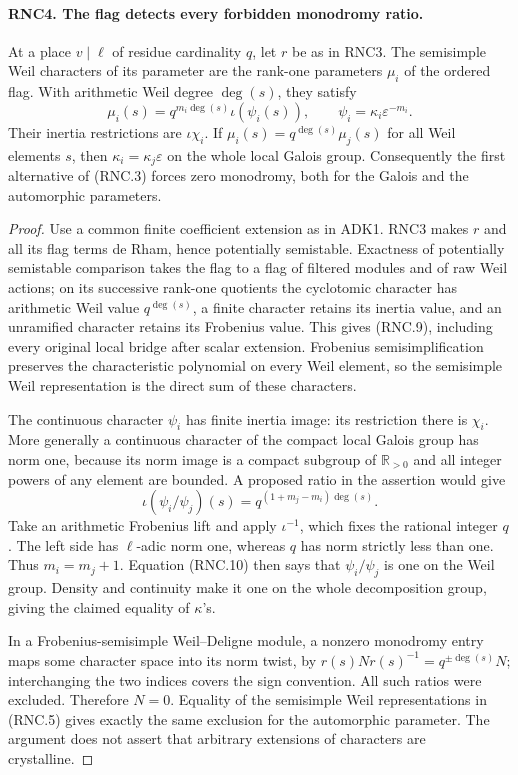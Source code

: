 \paragraph{RNC4. The flag detects every forbidden monodromy ratio.}
\label{claim:RNC4}
At a place $v\mid\ell$ of residue cardinality $q$, let $r$
be as in RNC3.  The semisimple Weil characters of its parameter
are the rank-one parameters $\mu_i$ of the ordered flag.
With arithmetic Weil degree $\deg(s)$, they satisfy
\[
 \mu_i(s)=q^{m_i\deg(s)}\iota(\psi_i(s)),\qquad
 \psi_i=\kappa_i\varepsilon^{-m_i}.                            \tag{RNC.9}
\]
Their inertia restrictions are $\iota\chi_i$.  If
$\mu_i(s)=q^{\deg(s)}\mu_j(s)$ for all Weil elements $s$,
then $\kappa_i=\kappa_j\varepsilon$ on the whole local Galois
group.  Consequently the first alternative of (RNC.3) forces
zero monodromy, both for the Galois and the automorphic
parameters.
\begin{proof}
Use a common finite coefficient extension as in ADK1.
RNC3 makes $r$ and all its flag terms de Rham, hence potentially
semistable.  Exactness of potentially semistable comparison
takes the flag to a flag of filtered modules and of raw Weil
actions; on its successive rank-one quotients the cyclotomic
character has arithmetic Weil value $q^{\deg(s)}$, a finite
character retains its inertia value, and an unramified
character retains its Frobenius value.  This gives (RNC.9),
including every original local bridge after scalar extension.
Frobenius semisimplification preserves the characteristic
polynomial on every Weil element, so the semisimple Weil
representation is the direct sum of these characters.

The continuous character $\psi_i$ has finite inertia image:
its restriction there is $\chi_i$.  More generally a continuous
character of the compact local Galois group has norm one,
because its norm image is a compact subgroup of
$\mathbb R_{>0}$ and all integer powers of any element are
bounded.  A proposed ratio in the assertion would give
\[
 \iota(\psi_i/\psi_j)(s)
                    =q^{(1+m_j-m_i)\deg(s)}.
                                                               \tag{RNC.10}
\]
Take an arithmetic Frobenius lift and apply $\iota^{-1}$,
which fixes the rational integer $q$.  The left side has
$\ell$-adic norm one, whereas $q$ has norm strictly less than
one.  Thus $m_i=m_j+1$.  Equation (RNC.10) then says that
$\psi_i/\psi_j$ is one on the Weil group.  Density and
continuity make it one on the whole decomposition group,
giving the claimed equality of $\kappa$'s.

In a Frobenius-semisimple Weil--Deligne module, a nonzero
monodromy entry maps some character space into its norm twist,
by $r(s)Nr(s)^{-1}=q^{\pm\deg(s)}N$; interchanging the two
indices covers the sign convention.  All such ratios were
excluded.  Therefore $N=0$.  Equality of the semisimple Weil
representations in (RNC.5) gives exactly the same exclusion
for the automorphic parameter.  The argument does not assert
that arbitrary extensions of characters are crystalline.
\end{proof}

